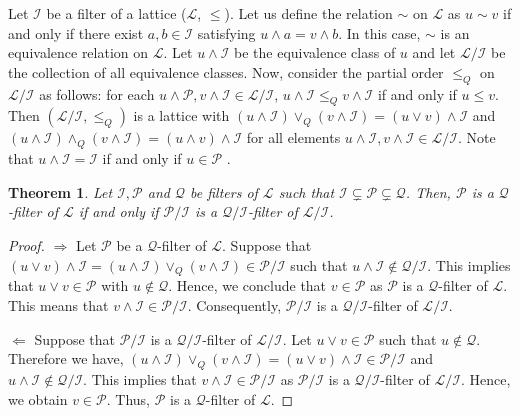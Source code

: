 \documentclass[preprint,review,10pt]{amsart}
\newtheorem{theorem}{Theorem}[section]
\theoremstyle{definition}
\theoremstyle{remark}
\numberwithin{equation}{section}
\begin{document}
Let  $\mathcal{I}$ be  a filter of a lattice ($\mathcal{L}$, $\le$). Let  us define   the  relation $\sim$ on $\mathcal{L}$ as  $u \sim v$ if and only if there exist $a, b\in \mathcal{I}$ satisfying $u \wedge a = v \wedge b$. In this case,  $\sim$ is an equivalence relation on $\mathcal{L}$.  Let  $u \wedge \mathcal{I}$ be the equivalence class of $u$   and let $ \mathcal{L}/ \mathcal{I}$ be the collection of all equivalence classes. Now, consider the partial order $\le_Q$ on $ \mathcal{L}/ \mathcal{I}$ as follows: for each $u \wedge \mathcal{P}, v \wedge \mathcal{I} \in   \mathcal{L}/ \mathcal{I}$,  $u \wedge \mathcal{I} \le_Q v \wedge \mathcal{I}$ if and only if $u \le v$. Then $(\mathcal{L}/ \mathcal{I},\le_Q)$ is a lattice with $(u \wedge \mathcal{I} ) \vee_Q (v \wedge \mathcal{I} ) = (u \vee v) \wedge \mathcal{I}$ and $(u \wedge \mathcal{I} ) \wedge_Q (v \wedge \mathcal{I} ) = (u \wedge v) \wedge \mathcal{I}$ for all elements $u \wedge \mathcal{I}, v \wedge \mathcal{I} \in \mathcal{L}/ \mathcal{I}$. Note that $u \wedge \mathcal{I} = \mathcal{I}$ if and only if $u \in \mathcal{P}$ \cite{Atani2}.  %
\begin{theorem}
Let $\mathcal{I}, \mathcal{P}$ and $ \mathcal{Q}$  be    filters of $\mathcal{L}$ such that $\mathcal{I} \subsetneq \mathcal{P} \subsetneq \mathcal{Q}$. Then, $ \mathcal{P}$ is a   $\mathcal{Q}$-filter of $\mathcal{L}$ if and only if  $\mathcal{P}/ \mathcal{I}$ is a  $\mathcal{Q}/ \mathcal{I}$-filter of $\mathcal{L}/ \mathcal{I}$.
\end{theorem}
\begin{proof}
$\Longrightarrow$ Let $ \mathcal{P}$ be a   $\mathcal{Q}$-filter of $\mathcal{L}$. Suppose that $(u \vee v) \wedge \mathcal{I}=(u \wedge \mathcal{I}) \vee_Q (v \wedge \mathcal{I}) \in \mathcal{P}/ \mathcal{I}$ such that $u \wedge \mathcal{I} \notin \mathcal{Q}/ \mathcal{I}$. This implies that $u \vee v \in  \mathcal{P}$ with $u \notin \mathcal{Q}$. Hence, we conclude that $v \in \mathcal{P}$ as $ \mathcal{P}$ is  a  $\mathcal{Q}$-filter of $\mathcal{L}$. This means that $v \wedge  \mathcal{I} \in \mathcal{P}/ \mathcal{I}$. Consequently, $\mathcal{P}/ \mathcal{I}$ is a  $\mathcal{Q}/ \mathcal{I}$-filter of $\mathcal{L}/ \mathcal{I}$.

$\Longleftarrow$ Suppose that $\mathcal{P}/ \mathcal{I}$ is a  $\mathcal{Q}/ \mathcal{I}$-filter of $\mathcal{L}/ \mathcal{I}$. Let $u \vee v \in \mathcal{P}$ such that $u \notin \mathcal{Q}$. Therefore we have, $(u \wedge \mathcal{I}) \vee_Q (v \wedge \mathcal{I})=(u \vee v) \wedge \mathcal{I} \in \mathcal{P}/ \mathcal{I}$ and  $u \wedge \mathcal{I} \notin \mathcal{Q}/ \mathcal{I}$. This   implies that $v \wedge \mathcal{I} \in \mathcal{P}/ \mathcal{I}$ as $\mathcal{P}/ \mathcal{I}$ is a  $\mathcal{Q}/ \mathcal{I}$-filter of $\mathcal{L}/ \mathcal{I}$. Hence, we obtain $v \in \mathcal{P}$. Thus, $ \mathcal{P}$ is a   $\mathcal{Q}$-filter of $\mathcal{L}$.
\end{proof}
\end{document}
